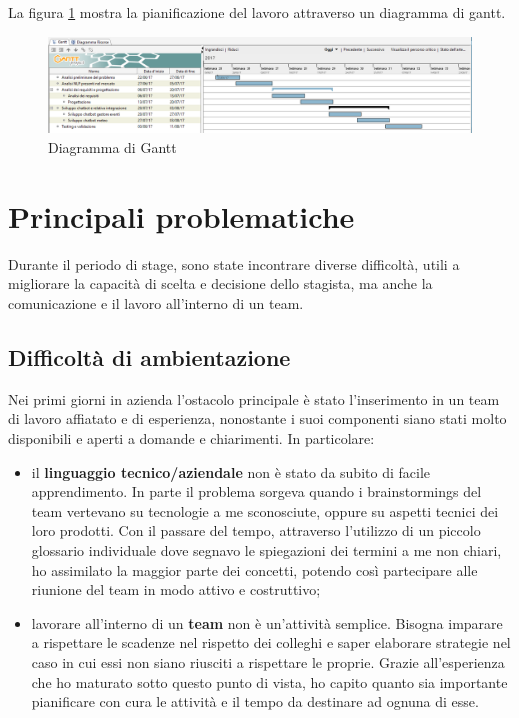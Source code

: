 La figura \ref{gantt} mostra la pianificazione del lavoro attraverso un \gls{diagramma di gantt}.
\begin{figure}[h]
	\centering
	\includegraphics[scale=0.4]{../Immagini/gantt.png}
	\caption{Diagramma di Gantt}\label{gantt}
\end{figure}

\section{Principali problematiche}
Durante il periodo di stage, sono state incontrare diverse difficoltà, utili a migliorare la capacità di scelta e decisione dello stagista, ma anche la comunicazione e il lavoro all'interno di un team.

\subsection{Difficoltà di ambientazione}
Nei primi giorni in azienda l'ostacolo principale è stato l'inserimento in un team di lavoro affiatato e di esperienza, nonostante i suoi componenti siano stati molto disponibili e aperti a domande e chiarimenti. In particolare:
\begin{itemize}
	\item il \textbf{linguaggio tecnico/aziendale} non è stato da subito di facile apprendimento. In parte il problema sorgeva quando i \glspl{brainstorming} del team vertevano su tecnologie a me sconosciute, oppure su aspetti tecnici dei loro prodotti. Con il passare del tempo, attraverso l'utilizzo di un piccolo glossario individuale dove segnavo le spiegazioni dei termini a me non chiari, ho assimilato la maggior parte dei concetti, potendo così partecipare alle riunione del team in modo attivo e costruttivo;
	\item lavorare all'interno di un \textbf{team} non è un'attività semplice. Bisogna imparare a rispettare le scadenze nel rispetto dei colleghi e saper elaborare strategie nel caso in cui essi non siano riusciti a rispettare le proprie. Grazie all'esperienza che ho maturato sotto questo punto di vista, ho capito quanto sia importante pianificare con cura le attività e il tempo da destinare ad ognuna di esse.
\end{itemize}

